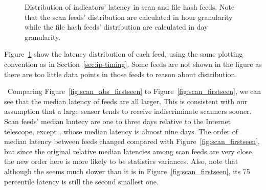 \begin{figure}[t!]
\centering
{}


\caption{Distribution of indicators' latency in scan and file hash feeds.
Note that the scan feeds' distribution are calculated in hour granularity while
the file hash feeds' distribution are calculated in day granularity.}
\label{fig:abs_firstseen}
\end{figure}


Figure~\ref{fig:abs_firstseen} show the latency distribution of each feed, using
the same plotting convention as in Section~\ref{sec:ip-timing}. Some feeds are not
shown in the figure as there are too little data points in those feeds to reason
about distribution.

\finding\
Comparing Figure~\ref{fig:scan_abs_firstseen} to Figure~\ref{fig:scan_firstseen},
we can see that the median latency of feeds are all larger. This is consistent with
our assumption that a large sensor tends to receive indiscriminate scanners sooner.
Scan feeds' median lantecy are one to three days relative to the Internet telescope,
except {\feedTSAnalyst}, whose median latency is almost nine days.
The order of median latency between feeds changed compared with Figure~\ref{fig:scan_firstseen},
but since the original relative median latencies among scan feeds are very close,
the new order here is more likely to be statistics variances. Also, note that
although the {\feedTSAlienVault} seems much slower than it is in
Figure~\ref{fig:scan_firstseen}, its 75 percentile latency is still the second
smallest one.

